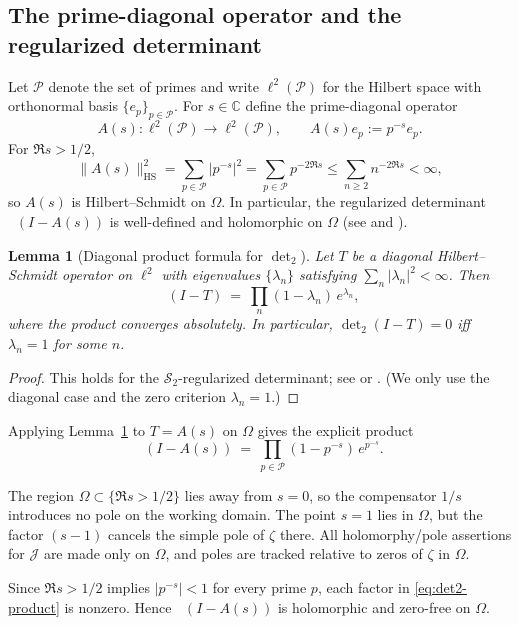 \documentclass[11pt]{amsart}
\newtheorem{lemma}[theorem]{Lemma}
\theoremstyle{definition}
\theoremstyle{remark}
\newcommand{\C}{\mathbb{C}}
\newcommand{\PP}{\mathcal{P}}
\DeclareMathOperator{\dettwo}{det_2}
\begin{document}
\subsection*{The prime-diagonal operator and the regularized determinant}
Let $\PP$ denote the set of primes and write $\ell^2(\PP)$ for the Hilbert space with orthonormal basis
$\{e_p\}_{p\in\PP}$.
For $s\in\C$ define the prime-diagonal operator
\[
  A(s):\ell^2(\PP)\to\ell^2(\PP),\qquad A(s)e_p:=p^{-s}e_p.
\]
For $\Re s>1/2$,
\[
  \|A(s)\|_{\mathrm{HS}}^2=\sum_{p\in\PP}|p^{-s}|^2=\sum_{p\in\PP}p^{-2\Re s}\le \sum_{n\ge 2}n^{-2\Re s}<\infty,
\]
so $A(s)$ is Hilbert--Schmidt on $\Omega$.
In particular, the regularized determinant $\dettwo(I-A(s))$ is well-defined and holomorphic on $\Omega$
(see \cite[Ch.~III]{RosenblumRovnyak} and \cite[Ch.~9]{SimonTrace}).
\begin{lemma}[Diagonal product formula for $\det_2$]\label{lem:det2-diagonal}
Let $T$ be a diagonal Hilbert--Schmidt operator on $\ell^2$ with eigenvalues $\{\lambda_n\}$ satisfying
$\sum_n|\lambda_n|^2<\infty$. Then
\[
  \dettwo(I-T)\ =\ \prod_{n}(1-\lambda_n)\,e^{\lambda_n},
\]
where the product converges absolutely. In particular, $\det_2(I-T)=0$ iff $\lambda_n=1$ for some $n$.
\end{lemma}
\begin{proof}
This holds for the $\mathcal S_2$-regularized determinant; see \cite[Ch.~III]{RosenblumRovnyak}
or \cite[Ch.~9]{SimonTrace}. (We only use the diagonal case and the zero criterion $\lambda_n=1$.)
\end{proof}

Applying Lemma~\ref{lem:det2-diagonal} to $T=A(s)$ on $\Omega$ gives the explicit product
\begin{equation}\label{eq:det2-product}
  \dettwo(I-A(s))\ =\ \prod_{p\in\PP}(1-p^{-s})\,e^{p^{-s}}.
\end{equation}

The region $\Omega\subset\{\Re s>1/2\}$ lies away from $s=0$, so the compensator $1/s$ introduces no pole on the working domain.
The point $s=1$ lies in $\Omega$, but the factor $(s-1)$ cancels the simple pole of $\zeta$ there.
All holomorphy/pole assertions for $\mathcal J$ are made only on $\Omega$, and poles are tracked relative to zeros of $\zeta$ in $\Omega$.

Since $\Re s>1/2$ implies $|p^{-s}|<1$ for every prime $p$, each factor in \eqref{eq:det2-product} is nonzero.
Hence $\dettwo(I-A(s))$ is holomorphic and zero-free on $\Omega$.
\end{document}
